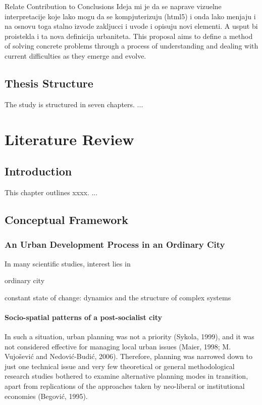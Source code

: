 \documentclass[11pt]{report}
\begin{document}
Relate Contribution to Conclusions
Ideja mi je da se naprave vizuelne interpretacije koje lako mogu da se kompjuterizuju (html5) i onda lako menjaju i na osnovu toga stalno izvode zakljucci i uvode i opisuju novi elementi.
A usput bi proistekla i ta nova definicija urbaniteta.
This proposal aims to define a method of solving concrete problems through a process of understanding and dealing with current difficulties as they emerge and evolve.

\section{Thesis Structure}

The study is structured in seven chapters. ...


\chapter{Literature Review}


\section{Introduction}

This chapter outlines xxxx. ...

\section{Conceptual Framework}

\subsection{An Urban Development Process in an Ordinary City}

In many scientific studies, interest lies in

ordinary city

constant state of change: dynamics and the structure of complex systems

\subsubsection{Socio-spatial patterns of a post-socialist city}

In such a situation, urban planning was not a priority (Sykola, 1999), and it was not considered effective for managing local urban issues (Maier, 1998; M. Vujošević and Nedović-Budić, 2006). Therefore, planning was narrowed down to just one technical issue and very few theoretical or general methodological research studies bothered to examine alternative planning modes in transition, apart from replications of the approaches taken by neo-liberal or institutional economies (Begović, 1995).
\end{document}
